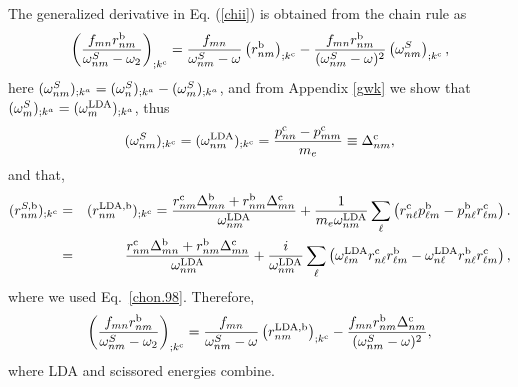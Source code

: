 \documentclass{article}
\begin{document}
The generalized derivative
in Eq. (\ref{chii}) is obtained from the chain rule as
\begin{equation}\label{gene}
\left(\frac{f_{mn}r_{nm}^{\mathrm{b}}}{\omega^S_{nm}-\omega_2}\right)_{;k^{\mathrm{c}}}=
\frac{f_{mn}}{\omega^S_{nm}-\omega}\left(r_{nm}^{\mathrm{b}}\right)_{;k^{\mathrm{c}}}
-\frac{f_{mn}r_{nm}^{\mathrm{b}}}{(\omega^S_{nm}-\omega)^2}\left(\omega^S_{nm}\right)_{;k^{\mathrm{c}}},
\end{equation} 
here $(\omega^S_{nm})_{;k^a}=(\omega^S_{n})_{;k^a}-(\omega^S_{m})_{;k^a}$, and 
from Appendix \ref{gwk} we show that 
$(\omega^S_{m})_{;k^a}=(\omega^{\mathrm{LDA}}_{m})_{;k^a}$, thus  
\begin{equation}\label{wk}
(\omega^S_{nm})_{;k^{\mathrm{c}}}=(\omega^{\mathrm{LDA}}_{nm})_{;k^{\mathrm{c}}}=
\frac{p_{nn}^{\mathrm{c}}-p_{mm}^{\mathrm{c}}}{m_e}\equiv\Delta_{nm}^{\mathrm{c}}
,
\end{equation}
and that,\cite{nastos_scissors_2005}
\begin{eqnarray}\label{rgk}
(r^{S,\mathrm{b}}_{nm})_{;k^{\mathrm{c}}}
&=&
(r^{\mathrm{LDA},\mathrm{b}}_{nm})_{;k^{\mathrm{c}}}=
\frac{r_{nm}^{\mathrm{c}}\Delta_{mn}^{\mathrm{b}}+r_{nm}^{\mathrm{b}}\Delta_{mn}^{\mathrm{c}}}{\omega^{\mathrm{LDA}}_{nm}}
+\frac{1}{m_e\omega^{\mathrm{LDA}}_{nm}}\sum_\ell\left(r_{n\ell}^{\mathrm{c}}p_{\ell m}^{\mathrm{b}}
-p_{n\ell}^{\mathrm{b}}r_{\ell m}^{\mathrm{c}}\right).
\nonumber\\
&=&
\frac{r_{nm}^{\mathrm{c}}\Delta_{mn}^{\mathrm{b}}+r_{nm}^{\mathrm{b}}\Delta_{mn}^{\mathrm{c}}}{\omega^{\mathrm{LDA}}_{nm}}
+\frac{i}{\omega^{\mathrm{LDA}}_{nm}}\sum_\ell\left(\omega^{\mathrm{LDA}}_{\ell m}r_{n\ell}^{\mathrm{c}}r_{\ell m}^{\mathrm{b}}
-\omega^{\mathrm{LDA}}_{n \ell}r_{n\ell}^{\mathrm{b}}r_{\ell m}^{\mathrm{c}}\right),
\end{eqnarray} 
where we used Eq.~\eqref{chon.98}. Therefore,
\begin{equation}\label{gene2}
\left(\frac{f_{mn}r_{nm}^{\mathrm{b}}}{\omega^S_{nm}-\omega_2}\right)_{;k^{\mathrm{c}}}=
\frac{f_{mn}}{\omega^S_{nm}-\omega}\left(r_{nm}^{\mathrm{LDA},\mathrm{b}}\right)_{;k^{\mathrm{c}}}
-\frac{f_{mn}r_{nm}^{\mathrm{b}}\Delta_{nm}^{\mathrm{c}}}{(\omega^S_{nm}-\omega)^2}
,
\end{equation}
where LDA and scissored energies combine.
\end{document}
